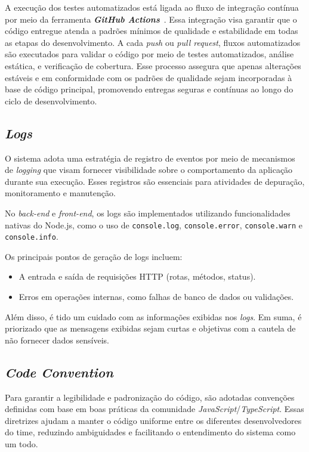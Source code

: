 A execução dos testes automatizados está ligada ao fluxo de integração contínua por meio da ferramenta \textbf{\textit{GitHub Actions}}~\cite{githubactions-2025}. Essa integração visa garantir que o código entregue atenda a padrões mínimos de qualidade e estabilidade em todas as etapas do desenvolvimento.  A cada \textit{push} ou \textit{pull request}, fluxos automatizados são executados para validar o código por meio de testes automatizados, análise estática, e verificação de cobertura. Esse processo assegura que apenas alterações estáveis e em conformidade com os padrões de qualidade sejam incorporadas à base de código principal, promovendo entregas seguras e contínuas ao longo do ciclo de desenvolvimento.

\subsection{\textit{Logs}}
O sistema adota uma estratégia de registro de eventos por meio de mecanismos de \textit{logging} que visam fornecer visibilidade sobre o comportamento da aplicação durante sua execução. Esses registros são essenciais para atividades de depuração, monitoramento e manutenção.

No \textit{back-end} e \textit{front-end}, os logs são implementados utilizando funcionalidades nativas do Node.js, como o uso de \texttt{console.log}, \texttt{console.error}, \texttt{console.warn} e \texttt{console.info}.

Os principais pontos de geração de logs incluem:
\begin{itemize}
	\item A entrada e saída de requisições HTTP (rotas, métodos, status).
	\item Erros em operações internas, como falhas de banco de dados ou validações.
\end{itemize}

Além disso, é tido um cuidado com as informações exibidas nos \textit{logs}. Em suma, é priorizado que as mensagens exibidas sejam curtas e objetivas com a cautela de não fornecer dados sensíveis.

\subsection{\textit{Code Convention}}
Para garantir a legibilidade e padronização do código, são adotadas convenções definidas com base em boas práticas da comunidade \textit{JavaScript}/\textit{TypeScript}.
Essas diretrizes ajudam a manter o código uniforme entre os diferentes desenvolvedores do time, reduzindo ambiguidades e facilitando o entendimento do sistema como um todo.

